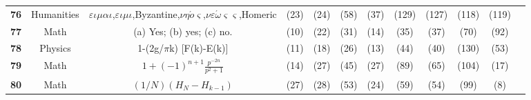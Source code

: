 \begin{table*}[htb]
\begin{center}
\begin{tiny}
\begin{tabular}{l|c|c|ccccccccc}
\textbf{76} & Humanities & $\varepsilon\iota\mu\alpha\iota$,$\varepsilon\iota\mu\iota$,Byzantine,$\nu\eta\acute{o}\varsigma$,$\nu\varepsilon\acute{\omega}\varsigma\varsigma$,Homeric & \X (23) & \X (24) & \X (58) & \X (37) & \X (129) & \X (127) & \X (118) & \X (119)\\
\textbf{77} & Math & (a) Yes; (b) yes; (c) no.  & \X (10) & \C (22) & \C (31) & \C (14) & \X (35) & \X (37) & \X (70) & \X (92)\\
\textbf{78} & Physics & 1-(2g/$\pi$k) [F(k)-E(k)]  & \X (11) & \X (18) & \X (26) & \X (13) & \X (44) & \X (40) & \X (130) & \X (53)\\
\textbf{79} & Math & $1+(-1)^{n+1}\frac{p^{-2n}}{p^2+1}$  & \X (14) & \X (27) & \X (45) & \X (27) & \X (89) & \X (65) & \X (104) & \X (17)\\
\textbf{80} & Math & $(1/N)(H_N - H_{k-1})$  & \X (27) & \X (28) & \X (53) & \X (24) & \X (59) & \X (54) & \X (99) & \X (8)\\


\end{tabular}
\end{tiny}
\end{center}
\end{table*}
